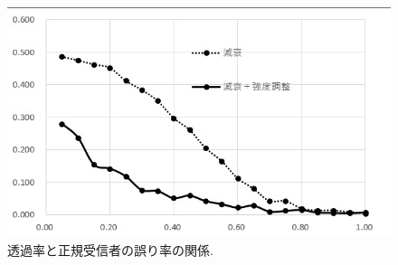\begin{figure}[htbp]
        \centering   
        \includegraphics[width=1\textwidth]{img/zemi16.png}
        \caption[sample image (png)]{透過率と正規受信者の誤り率の関係.}
        \label{Fig:5_4}
    \end{figure}
